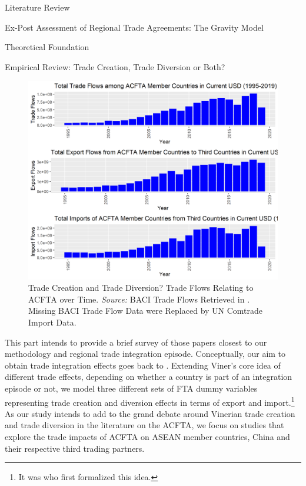 \begin{section}{Literature Review}
\begin{subsection}{Ex-Post Assessment of Regional Trade Agreements: The Gravity Model}
\begin{subsubsection}{Theoretical Foundation}
\end{subsubsection}

\begin{subsubsection}{Empirical Review: Trade Creation, Trade Diversion or Both?}

\begin{figure}[H]
	\centering
	\includegraphics[width=\textwidth]{figure_2.png}
	\caption{\small{Trade Creation and Trade Diversion? Trade Flows Relating to ACFTA over Time. \textit{Source:} BACI Trade Flows Retrieved in \cite{cepii-data_2022}. Missing BACI Trade Flow Data were Replaced by UN Comtrade Import Data.}}
	\label{fig_2}
\end{figure}

This part intends to provide a brief survey of those papers closest to our methodology and regional trade integration episode. Conceptually, our aim to obtain trade integration effects goes back to \cite{viner1950}. Extending Viner's core idea of different trade effects, depending on whether a country is part of an integration episode or not, we model three different sets of FTA dummy variables representing trade creation and diversion effects in terms of export and import.\footnote{It was \cite{endoh1999} who first formalized this idea.} As our study intends to add to the grand debate around Vinerian trade creation and trade diversion in the literature on the ACFTA, we focus on studies that explore the trade impacts of ACFTA on ASEAN member countries, China and their respective third trading partners. 


\end{subsubsection}
\end{subsection}
\end{section}
